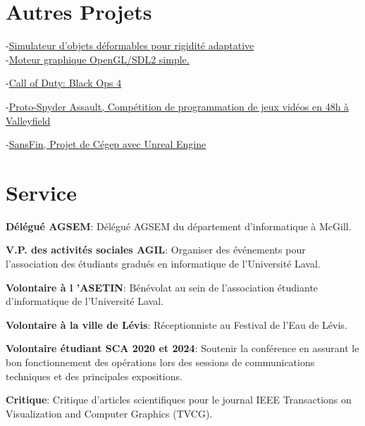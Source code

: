 \documentclass[10pt]{article} %
\begin{document}

\section{Autres Projets}

{
-\href{https://github.com/AlexandreMercierAubin/AdaptiveRigidification2022}{Simulateur d'objets déformables pour rigidité adaptative}\\
-\href{https://github.com/AlexandreMercierAubin/ComputerGraphics}{Moteur graphique OpenGL/SDL2 simple.}\\

}

{
-\href{https://www.callofduty.com/ca/en/blackops4}{Call of Duty: Black Ops 4}

-\href{https://youtu.be/qJjy8b0kuSY}{Proto-Spyder Assault, Compétition de programmation de jeux vidéos en 48h à Valleyfield}

-\href{https://youtu.be/s6vr07Nt1IY}{SansFin, Projet de Cégep avec Unreal Engine}
}

\section{Service}
\textbf{Délégué AGSEM}: Délégué AGSEM du département d'informatique à McGill.

\noindent\textbf{V.P. des activités sociales AGIL}: Organiser des événements pour l'association des étudiants gradués en informatique de l'Université Laval.

\noindent\textbf{Volontaire à l 'ASETIN}: Bénévolat au sein de l'association étudiante d'informatique de l'Université Laval.

\noindent\textbf{Volontaire à la ville de Lévis}: Réceptionniste au Festival de l'Eau de Lévis.

\noindent\textbf{Volontaire étudiant SCA 2020 et 2024}: Soutenir la conférence en assurant le bon fonctionnement des opérations lors des
sessions de communications techniques et des principales expositions.

\noindent\textbf{Critique}: Critique d'articles scientifiques pour le journal IEEE Transactions on Visualization and Computer Graphics (TVCG).
\end{document}
